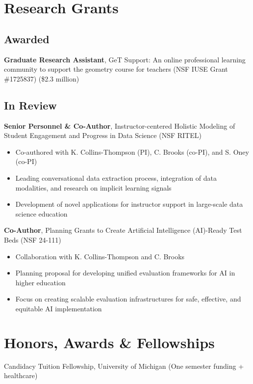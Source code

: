 \section*{Research Grants}

\subsection*{Awarded}

 \textbf{Graduate Research Assistant}, GeT Support: An online professional learning community to support the geometry course for teachers (NSF IUSE Grant \#1725837) (\$2.3 million)

\subsection*{In Review}

 \textbf{Senior Personnel \& Co-Author}, Instructor-centered Holistic Modeling of Student Engagement and Progress in Data Science (NSF RITEL)
\begin{itemize}
    \item Co-authored with K. Collins-Thompson (PI), C. Brooks (co-PI), and S. Oney (co-PI)
    \item Leading conversational data extraction process, integration of data modalities, and research on implicit learning signals
    \item Development of novel applications for instructor support in large-scale data science education
\end{itemize}

 \textbf{Co-Author}, Planning Grants to Create Artificial Intelligence (AI)-Ready Test Beds (NSF 24-111)
\begin{itemize}
    \item Collaboration with K. Collins-Thompson and C. Brooks
    \item Planning proposal for developing unified evaluation frameworks for AI in higher education
    \item Focus on creating scalable evaluation infrastructures for safe, effective, and equitable AI implementation
\end{itemize}

\section*{Honors, Awards \& Fellowships}

 Candidacy Tuition Fellowship, University of Michigan (One semester funding + healthcare)

